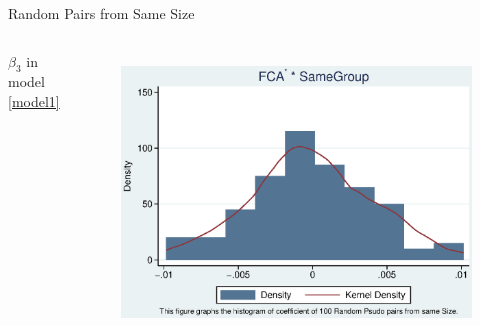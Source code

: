 \documentclass{beamer}
\begin{document}
	\begin{frame}{Random Pairs from Same Size}
		
		\begin{columns}\centering
			\begin{center}
				$ \beta_3 $ in model \ref{model1}
			\end{center}
			\begin{figure}
				\centering
				\includegraphics[width=\linewidth]{SizePseudoSBFCA.eps}\\
				

\end{figure}
\end{columns}
\end{frame}
\end{document}
